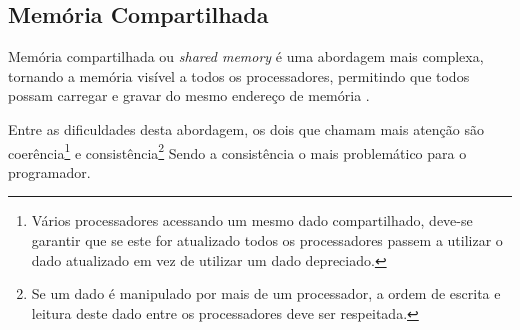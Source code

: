 \subsection{Memória Compartilhada}

Memória compartilhada ou \textit{shared memory} é uma abordagem mais complexa, 
tornando a memória visível a todos os processadores, permitindo que 
todos possam carregar e gravar do mesmo endereço de memória \cite[2.2]{sopc}. 

Entre as dificuldades desta abordagem, os dois que chamam mais atenção são
coerência\footnote{
        Vários processadores acessando um mesmo dado compartilhado, deve-se
                garantir que se este for atualizado todos os processadores
                passem a utilizar o dado atualizado em vez de utilizar um dado
                depreciado.} 
e consistência\footnote{Se um dado é manipulado por mais de um processador,
        a ordem de escrita e leitura deste dado entre os processadores deve 
                ser respeitada.}
Sendo a consistência o mais problemático para o programador.





